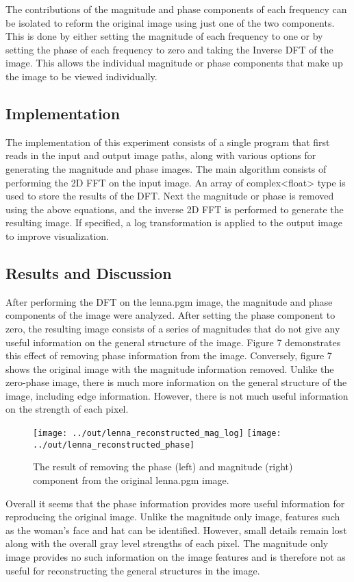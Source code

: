 \documentclass[headings=optiontoheadandtoc,listof=totoc,parskip=full]{scrartcl}
\begin{document}
The contributions of the magnitude and phase components of each frequency can be isolated to reform the original image using just one of the two components. This is done by either setting the magnitude of each frequency to one or by setting the phase of each frequency to zero and taking the Inverse DFT of the image. This allows the individual magnitude or phase components that make up the image to be viewed individually.

\subsection{Implementation}

The implementation of this experiment consists of a single program that first reads in the input and output image paths, along with various options for generating the magnitude and phase images. The main algorithm consists of performing the 2D FFT on the input image. An array of complex<float> type is used to store the results of the DFT. Next the magnitude or phase is removed using the above equations, and the inverse 2D FFT is performed to generate the resulting image. If specified, a log transformation is applied to the output image to improve visualization.

\subsection{Results and Discussion}

After performing the DFT on the lenna.pgm image, the magnitude and phase components of the image were analyzed. After setting the phase component to zero, the resulting image consists of a series of magnitudes that do not give any useful information on the general structure of the image. Figure 7 demonstrates this effect of removing phase information from the image. Conversely, figure 7 shows the original image with the magnitude information removed. Unlike the zero-phase image, there is much more information on the general structure of the image, including edge information. However, there is not much useful information on the strength of each pixel.

\begin{figure}[ht]
	\centering
	\texttt{[image: ../out/lenna\_reconstructed\_mag\_log]}
	\texttt{[image: ../out/lenna\_reconstructed\_phase]}
	\caption{The result of removing the phase (left) and magnitude (right) component from the original lenna.pgm image.}
	\label{fig:lenna_mag_phase}
\end{figure}

Overall it seems that the phase information provides more useful information for reproducing the original image. Unlike the magnitude only image, features such as the woman’s face and hat can be identified. However, small details remain lost along with the overall gray level strengths of each pixel. The magnitude only image provides no such information on the image features and is therefore not as useful for reconstructing the general structures in the image.
\end{document}
